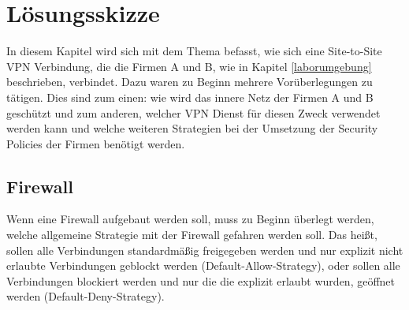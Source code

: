 \section{Lösungsskizze}\label{loesungsskizze}
In diesem Kapitel wird sich mit dem Thema befasst, wie sich eine Site-to-Site VPN Verbindung, die die Firmen A und B, wie in Kapitel \ref{laborumgebung} beschrieben, verbindet.
Dazu waren zu Beginn mehrere Vorüberlegungen zu tätigen. Dies sind zum einen: wie wird das innere Netz der Firmen A und B geschützt und zum anderen, welcher VPN Dienst für diesen Zweck verwendet werden kann und welche weiteren Strategien bei der Umsetzung der Security Policies der Firmen benötigt werden. 
\subsection{Firewall}\label{firewallloesung}
Wenn eine Firewall aufgebaut werden soll, muss zu Beginn überlegt werden, welche allgemeine Strategie mit der Firewall gefahren werden soll. Das heißt, sollen alle Verbindungen standardmäßig freigegeben werden und nur explizit nicht erlaubte Verbindungen geblockt werden (Default-Allow-Strategy), oder sollen alle Verbindungen blockiert werden und nur die die explizit erlaubt wurden, geöffnet werden (Default-Deny-Strategy). 

